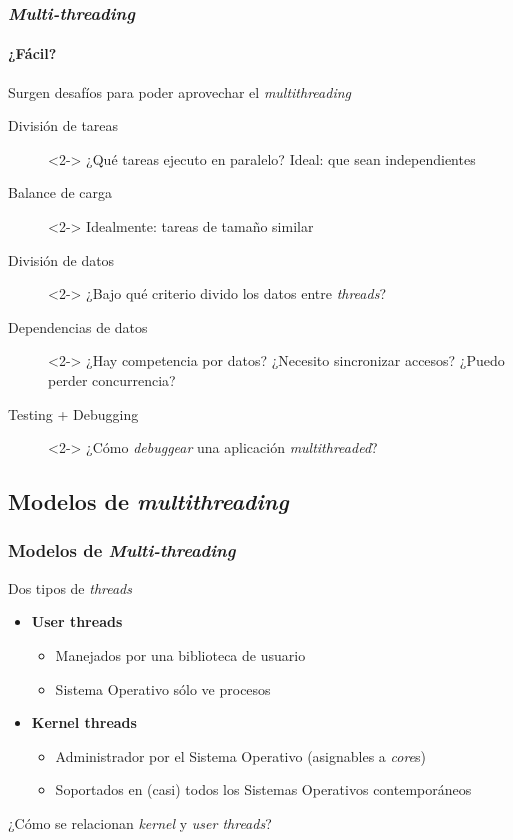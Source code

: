 \documentclass[letter]{beamer}
\begin{document}
\begin{frame}
  \frametitle{ {\em Multi-threading} }
  \framesubtitle{¿Fácil?}

  Surgen desafíos para poder aprovechar el {\em multithreading}
  \begin{description}
    \item[División de tareas]<2-> ¿Qué tareas ejecuto en paralelo? Ideal: que sean independientes
    \item[Balance de carga]<2-> Idealmente: tareas de tamaño similar
    \item[División de datos]<2-> ¿Bajo qué criterio divido los datos entre {\em threads}?
    \item[Dependencias de datos]<2-> ¿Hay competencia por datos? ¿Necesito sincronizar accesos? ¿Puedo perder concurrencia?
    \item[Testing + Debugging]<2-> ¿Cómo {\em debuggear} una aplicación {\em multithreaded}?
  \end{description}

\end{frame}


\subsection{Modelos de {\em multithreading}}

\begin{frame}
  \frametitle{ Modelos de {\em Multi-threading} }

  Dos tipos de {\em threads}
  
  \begin{itemize}
    \item {\bf User threads}
      \begin{itemize}
        \item Manejados por una biblioteca de usuario
        \item Sistema Operativo sólo ve procesos
      \end{itemize}
    \item {\bf Kernel threads}
      \begin{itemize}
        \item Administrador por el Sistema Operativo (asignables a {\em core}s)
        \item Soportados en (casi) todos los Sistemas Operativos contemporáneos
      \end{itemize}
  \end{itemize}
  
  ¿Cómo se relacionan {\em kernel} y {\em user threads}?

\end{frame}
\end{document}

